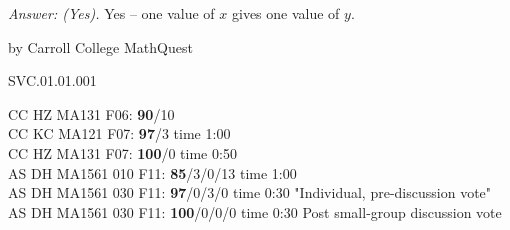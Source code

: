 {\it Answer: (Yes).} Yes -- one value of $x$ gives one value of $y$.

\medskip


\medskip
by Carroll College MathQuest

SVC.01.01.001


CC HZ MA131 F06: {\bf 90}/10 \\
CC KC MA121 F07: {\bf 97}/3  time 1:00 \\
CC HZ MA131 F07: {\bf 100}/0 time 0:50 \\
AS DH MA1561 010 F11: {\bf 85}/3/0/13 time 1:00  \\
AS DH MA1561 030 F11: {\bf 97}/0/3/0 time 0:30 "Individual, pre-discussion vote" \\
AS DH MA1561 030 F11: {\bf 100}/0/0/0 time 0:30 Post small-group discussion vote \\
